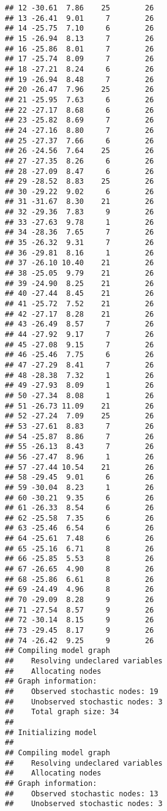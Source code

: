 \documentclass[
]{article}
\begin{document}
\begin{verbatim}
## 12 -30.61  7.86    25        26
## 13 -26.41  9.01     7        26
## 14 -25.75  7.10     6        26
## 15 -26.94  8.13     7        26
## 16 -25.86  8.01     7        26
## 17 -25.74  8.09     7        26
## 18 -27.21  8.24     6        26
## 19 -26.94  8.48     7        26
## 20 -26.47  7.96    25        26
## 21 -25.95  7.63     6        26
## 22 -27.17  8.68     6        26
## 23 -25.82  8.69     7        26
## 24 -27.16  8.80     7        26
## 25 -27.37  7.66     6        26
## 26 -24.56  7.64    25        26
## 27 -27.35  8.26     6        26
## 28 -27.09  8.47     6        26
## 29 -28.52  8.83    25        26
## 30 -29.22  9.02     6        26
## 31 -31.67  8.30    21        26
## 32 -29.36  7.83     9        26
## 33 -27.63  9.78     1        26
## 34 -28.36  7.65     7        26
## 35 -26.32  9.31     7        26
## 36 -29.81  8.16     1        26
## 37 -26.10 10.40    21        26
## 38 -25.05  9.79    21        26
## 39 -24.90  8.25    21        26
## 40 -27.44  8.45    21        26
## 41 -25.72  7.52    21        26
## 42 -27.17  8.28    21        26
## 43 -26.49  8.57     7        26
## 44 -27.92  9.17     7        26
## 45 -27.08  9.15     7        26
## 46 -25.46  7.75     6        26
## 47 -27.29  8.41     7        26
## 48 -28.38  7.32     1        26
## 49 -27.93  8.09     1        26
## 50 -27.34  8.08     1        26
## 51 -26.73 11.09    21        26
## 52 -27.24  7.09    25        26
## 53 -27.61  8.83     7        26
## 54 -25.87  8.86     7        26
## 55 -26.13  8.43     7        26
## 56 -27.47  8.96     1        26
## 57 -27.44 10.54    21        26
## 58 -29.45  9.01     6        26
## 59 -30.04  8.23     1        26
## 60 -30.21  9.35     6        26
## 61 -26.33  8.54     6        26
## 62 -25.58  7.35     6        26
## 63 -25.46  6.54     6        26
## 64 -25.61  7.48     6        26
## 65 -25.16  6.71     8        26
## 66 -25.85  5.53     8        26
## 67 -26.65  4.90     8        26
## 68 -25.86  6.61     8        26
## 69 -24.49  4.96     8        26
## 70 -29.09  8.28     9        26
## 71 -27.54  8.57     9        26
## 72 -30.14  8.15     9        26
## 73 -29.45  8.17     9        26
## 74 -26.42  9.25     9        26
## Compiling model graph
##    Resolving undeclared variables
##    Allocating nodes
## Graph information:
##    Observed stochastic nodes: 19
##    Unobserved stochastic nodes: 3
##    Total graph size: 34
## 
## Initializing model
## 
## Compiling model graph
##    Resolving undeclared variables
##    Allocating nodes
## Graph information:
##    Observed stochastic nodes: 13
##    Unobserved stochastic nodes: 3

\end{verbatim}
\end{document}
